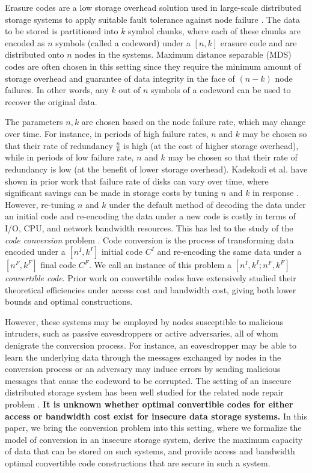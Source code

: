 Erasure codes are a low storage overhead solution used in large-scale distributed storage systems to apply suitable fault tolerance against node failure \cite{erasureCodingInAzure,googleFileSystem}. 
The data to be stored is partitioned into $k$ symbol chunks, where each of these chunks are encoded as $n$ symbols (called a codeword) under a $[n,k]$ erasure code and are distributed onto $n$ nodes in the systems.
Maximum distance separable (MDS) codes are often chosen in this setting since they require the minimum amount of storage overhead and guarantee of data integrity in the face of $(n - k)$ node failures. 
In other words, any $k$ out of $n$ symbols of a codeword can be used to recover the original data.

The parameters $n,k$ are chosen based on the node failure rate, which may change over time.
For instance, in periods of high failure rates, $n$ and $k$ may be chosen so that their rate of redundancy $\frac{n}{k}$ is high (at the cost of higher storage overhead), while in periods of low failure rate, $n$ and $k$ may be chosen so that their rate of redundancy is low (at the benefit of lower storage overhead).
Kadekodi et al. have shown in prior work that failure rate of disks can vary over time, where significant savings can be made in storage costs by tuning $n$ and $k$ in response \cite{Heart}. 
However, re-tuning $n$ and $k$ under the default method of decoding the data under an initial code and re-encoding the data under a new code is costly in terms of I/O, CPU, and network bandwidth resources. 
This has led to the study of the \textit{code conversion} problem \cite{maturanaAccessAll,maturanaMergeBandwidth,maturanaAccessMerge,maturanaSplitBandwidth}. Code conversion is the process of transforming data encoded under a $[n^I,k^I]$ initial code $C^I$ and re-encoding the same data under a $[n^F,k^F]$ final code $C^F$. We call an instance of this problem a $[n^I,k^I; n^F, k^F]$ \textit{convertible code}.
Prior work on convertible codes have extensively studied their theoretical efficiencies under access cost and bandwidth cost, giving both lower bounds and optimal constructions.

However, these systems may be employed by nodes susceptible to malicious intruders, such as passive eavesdroppers or active adversaries, all of whom denigrate the conversion process. 
For instance, an eavesdropper may be able to learn the underlying data through the messages exchanged by nodes in the conversion process or an adversary may induce errors by sending malicious messages that cause the codeword to be corrupted.
The setting of an insecure distributed storage system has been well studied for the related node repair problem \cite{pawarSecureDSS}. 
\textbf{It is unknown whether optimal convertible codes for either access or bandwidth cost exist for insecure data storage systems.}
In this paper, we bring the conversion problem into this setting, where we formalize the model of conversion in an insecure storage system, derive the maximum capacity of data that can be stored on such systems, and provide access and bandwidth optimal convertible code constructions that are secure in such a system.
